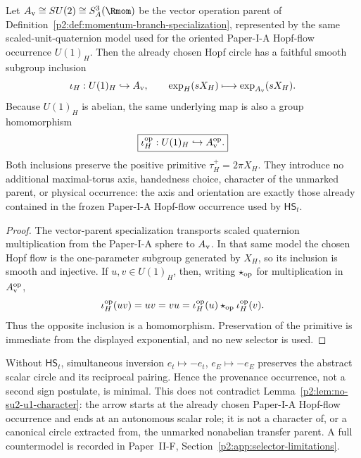 \documentclass[12pt,a4paper]{article}
\begin{document}
\begin{lemma}
\label{p2:lem:chosen-hopf-vector-parent-inclusion}
Let \(A_{\rm v}\cong SU(2)\cong S^3_A(\Rmom)\) be the vector operation parent
of Definition~\ref{p2:def:momentum-branch-specialization}, represented by the
same scaled-unit-quaternion model used for the oriented Paper-I-A Hopf-flow
occurrence \(U(1)_H\).  Then the already chosen Hopf circle has a faithful
smooth subgroup inclusion
\[
 \iota_H:U(1)_H\hookrightarrow A_{\rm v},
 \qquad
 \exp_H(sX_H)\longmapsto \exp_{A_{\rm v}}(sX_H).
\]
Because \(U(1)_H\) is abelian, the same underlying map is also a group
homomorphism
\[
 \boxed{\iota_H^{\rm op}:U(1)_H\hookrightarrow A_{\rm v}^{\rm op}.}
\]
Both inclusions preserve the positive primitive
\(\tau_H^+=2\pi X_H\).  They introduce no additional maximal-torus axis,
handedness choice, character of the unmarked parent, or physical occurrence:
the axis and orientation are exactly those already contained in the frozen
Paper-I-A Hopf-flow occurrence used by \(\mathsf{HS}_t\).
\end{lemma}

\begin{proof}
The vector-parent specialization transports scaled quaternion multiplication
from the Paper-I-A sphere to \(A_{\rm v}\).  In that same model the chosen
Hopf flow is the one-parameter subgroup generated by \(X_H\), so its inclusion
is smooth and injective.  If \(u,v\in U(1)_H\), then, writing
\(\star_{\rm op}\) for multiplication in \(A_{\rm v}^{\rm op}\),
\[
 \iota_H^{\rm op}(uv)=uv=vu
 =\iota_H^{\rm op}(u)\star_{\rm op}\iota_H^{\rm op}(v).
\]
Thus the opposite inclusion is a homomorphism.  Preservation of the primitive
is immediate from the displayed exponential, and no new selector is used.
\end{proof}

\begin{remark}
\label{p2:rem:hopf-succession-provenance-scope}
Without \(\mathsf{HS}_t\), simultaneous inversion
\(e_t\mapsto-e_t\), \(e_E\mapsto-e_E\) preserves the abstract scalar circle
and its reciprocal pairing.  Hence the provenance occurrence, not a second
sign postulate, is minimal.  This does not contradict
Lemma~\ref{p2:lem:no-su2-u1-character}: the arrow starts at the already chosen
Paper-I-A Hopf-flow occurrence and ends at an autonomous scalar role; it is not
a character of, or a canonical circle extracted from, the unmarked
nonabelian transfer parent.  A full countermodel is recorded in
Paper~II-F, Section~\ref{p2:app:selector-limitations}.
\end{remark}
\end{document}
